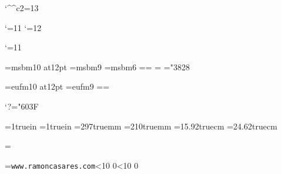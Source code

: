 
\catcode`\^^c2=13
\ifx\index\undefined  \fi

\catcode`\@=11
\let\utf=\relax
\let\utf@Ch=\relax
\let\stringate=\relax
\let\dohigh=\relax
\let\doaccents=\relax
\let\dosymbols=\relax
\let\deactivate=\relax
\def\stringaccents{\def\'{\string\'}\def\~{\string\~}%
 \def\"{\string\"}\def\`{\string\`}\def\^{\string\^}}
\catcode`\@=12

\files


\ifx\loadfont\undefined  \fi
\xiifonts \xiititles \rm

\catcode`\@=11

\font\xiibb=msbm10 at12pt
\font\ixbb=msbm9
\font\vibb=msbm6
\newfam\bbfam %
\textfont\bbfam=\xiibb \scriptfont\bbfam=\ixbb
\scriptscriptfont\bbfam=\vibb
\def\bb{\fam\bbfam\xiibb}
\mathchardef\subsetneq="3828

\font\xiifrak=eufm10 at12pt
\font\ixfrak=eufm9
\newfam\frakfam \textfont\frakfam=\xiifrak \scriptfont\frakfam=\ixfrak
\def\frak{\fam\frakfam\xiifrak}

\mathcode`?="603F %
\def\ifmath$#1${\relax\ifmmode #1\else$#1$\fi}
\def\QED{\ifmath$\diamond$}


\ifcase\pdfoutput\else
 \pdfhorigin=1truein
 \pdfvorigin=1truein
 \pdfpageheight=297truemm
 \pdfpagewidth=210truemm
\fi
\hsize=15.92truecm \vsize=24.62truecm %
\advance\vsize -30pt

\parskip=\medskipamount \parindent=0pt

\def\twodigits#1{\ifnum #1<10 0\fi \number#1}
\def\todayiso{\number\year \twodigits\month \twodigits\day}
\def\Folio{\ifnum\pageno<0
\uppercase\expandafter{\romannumeral-\pageno}\else\number\pageno\fi}

\headline={{\tt www.ramoncasares.com}\quad \todayiso \hfil
 \quad{\tt \jobname}\quad {\bf\Folio}}%
\def\makeheadline{\vbox to 30pt{\line{\the\headline}%
  \kern 1pt \hrule height 1pt\vfil}\nointerlineskip}
\nopagenumbers


\newcount\secno
\newcount\ssecno
\newcount\thno
\newcount\parno

\parskip=0pt
\newdimen\oldparindent \oldparindent=20pt \parindent=0pt
\def\hang{\hangindent\oldparindent}

\def\numberedpars{\global\advance\parno1 %
 \noindent\hbox to\oldparindent{{\xiiscriptsy\char123
  \xiiscriptrm\number\parno}\hfil$\cdot$\hfil}\ignorespaces}

